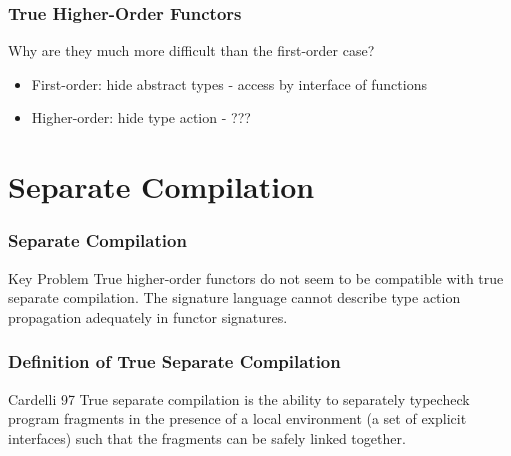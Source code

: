 \documentclass{beamer}
\begin{document}
\begin{frame}
\frametitle{True Higher-Order Functors}
\begin{block}{Why are they much more difficult than the first-order case?}
\begin{itemize}
	\item First-order: hide abstract types - access by interface of functions
	\item Higher-order: hide type action - ??? 
\end{itemize}	
\end{block}	
\end{frame}

\section{Separate Compilation}
\begin{frame}
\frametitle{Separate Compilation}
\begin{block}{Key Problem}
	True higher-order functors do not seem to be compatible with true separate compilation. The signature language cannot describe type action propagation adequately in functor signatures.
\end{block}
\end{frame}

\begin{frame}
\frametitle{Definition of True Separate Compilation}
\begin{block}{Cardelli 97}
True separate compilation is the ability to separately typecheck program fragments in the presence of a local environment (a set of explicit interfaces) such that the fragments can be safely linked together.
\end{block}	
\end{frame}
\end{document}
